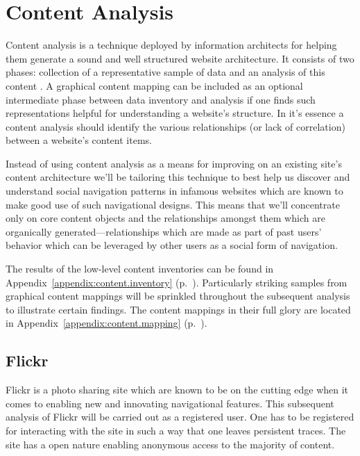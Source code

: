 \chapter{Content Analysis}

Content analysis is a technique deployed by information architects for helping
them generate a sound and well structured website architecture. It consists of
two phases: collection of a representative sample of data and an analysis of
this content \citep[pp.~241--243]{morville06}.
A graphical content mapping can be included as an optional
intermediate phase between data inventory and analysis if one finds such
representations helpful for understanding a website's structure.
In it's essence a content analysis should identify the various
relationships (or lack of correlation) between a website's content items.

Instead of using content analysis as a means for improving on an existing
site's content architecture we'll be tailoring this technique to best help us
discover and understand social navigation patterns in infamous websites which
are known to make good use of such navigational designs. This means that we'll
concentrate only on core content objects and the relationships amongst them
which are organically generated---relationships which are made as part of
past users' behavior which can be leveraged by other users as a social form
of navigation.

The results of the low-level content inventories can be found in
Appendix~\ref{appendix:content.inventory}
(p.~\pageref{appendix:content.inventory}).
Particularly striking %
samples from graphical content mappings will be sprinkled throughout the
subsequent analysis to illustrate certain findings. The content mappings in
their full glory are located in
Appendix~\ref{appendix:content.mapping}
(p.~\pageref{appendix:content.mapping}).

\section{Flickr}

Flickr is a photo sharing site which are known to be on the cutting edge when
it comes to enabling new and innovating navigational features. This subsequent
analysis of Flickr will be carried out as a registered user. One has to be
registered for interacting with the site in such a way that one leaves
persistent traces. The site has a open nature enabling anonymous access
to the majority of content.


